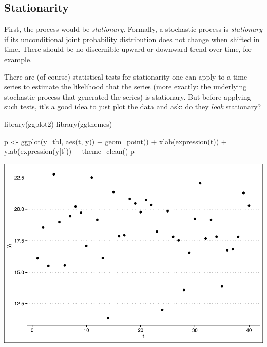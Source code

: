 \documentclass[
]{book}
\newenvironment{Shaded}{\begin{snugshade}}{\end{snugshade}}
\newcommand{\FunctionTok}[1]{\textcolor[rgb]{0.00,0.00,0.00}{#1}}
\newcommand{\NormalTok}[1]{#1}
\newcommand{\OtherTok}[1]{\textcolor[rgb]{0.56,0.35,0.01}{#1}}
\newcommand{\SpecialCharTok}[1]{\textcolor[rgb]{0.00,0.00,0.00}{#1}}
\begin{document}
\hypertarget{stationarity}{%
\subsection{Stationarity}\label{stationarity}}

First, the process would be \emph{stationary}. Formally, a stochastic process is \emph{stationary} if its unconditional joint probability distribution does not change when shifted in time. There should be no discernible upward or downward trend over time, for example.

There are (of course) statistical tests for stationarity one can apply to a time series to estimate the likelihood that the series (more exactly: the underlying stochastic process that generated the series) is stationary. But before applying such tests, it's a good idea to just plot the data and ask: do they \emph{look} stationary?

\begin{Shaded}
\begin{Highlighting}[]
\FunctionTok{library}\NormalTok{(ggplot2)}
\FunctionTok{library}\NormalTok{(ggthemes)}

\NormalTok{p }\OtherTok{\textless{}{-}} \FunctionTok{ggplot}\NormalTok{(y\_tbl, }\FunctionTok{aes}\NormalTok{(t, y)) }\SpecialCharTok{+} \FunctionTok{geom\_point}\NormalTok{() }\SpecialCharTok{+} \FunctionTok{xlab}\NormalTok{(}\FunctionTok{expression}\NormalTok{(t)) }\SpecialCharTok{+} \FunctionTok{ylab}\NormalTok{(}\FunctionTok{expression}\NormalTok{(y[t])) }\SpecialCharTok{+} \FunctionTok{theme\_clean}\NormalTok{()}
\NormalTok{p}
\end{Highlighting}
\end{Shaded}

\includegraphics{graphics/unnamed-chunk-54-1.pdf}
\end{document}
